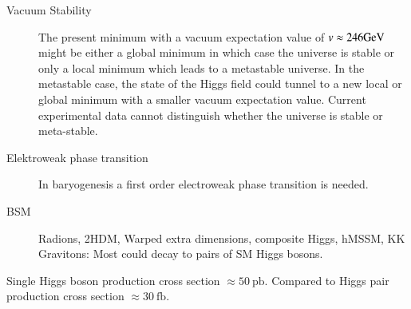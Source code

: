 
\begin{description}


\item[Vacuum Stability] The present minimum with a vacuum expectation
  value of $v \approx \si{246}{\ensuremath{\text{GeV}}}$ might be either a global minimum
  in which case the universe is stable or only a local minimum which
  leads to a metastable universe. In the metastable case, the state of
  the Higgs field could tunnel to a new local or global minimum with a
  smaller vacuum expectation value. Current experimental data cannot
  distinguish whether the universe is stable or
  meta-stable.

\item[Elektroweak phase transition] In baryogenesis a first order
  electroweak phase transition is needed.

\item[BSM] Radions, 2HDM, Warped extra dimensions, composite Higgs,
  hMSSM, KK Gravitons: Most could decay to pairs of SM Higgs bosons.

\end{description}

Single Higgs boson production cross section
$\approx \SI{50}{\pico\barn}$. Compared to Higgs pair production cross
section $\approx \SI{30}{\femto\barn}$.






